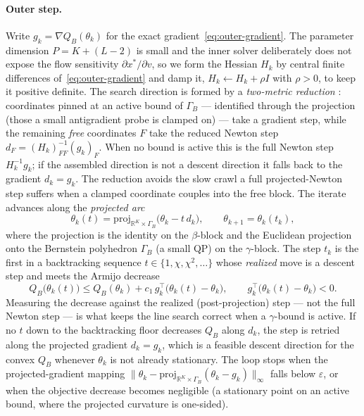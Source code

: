 \documentclass[12pt]{article}
\begin{document}
\paragraph{Outer step.} Write $g_k = \nabla Q_B(\theta_k)$ for the exact
gradient~\eqref{eq:outer-gradient}. The parameter dimension $P = K + (L-2)$ is
small and the inner solver deliberately does not expose the flow sensitivity
$\partial x^*/\partial v$, so we form the Hessian $H_k$ by central finite
differences of~\eqref{eq:outer-gradient} and damp it, $H_k \leftarrow H_k + \rho I$
with $\rho>0$, to keep it positive definite. The search direction is formed by a
\emph{two-metric reduction} \citep{nocedal2006numerical}: coordinates pinned at an
active bound of $\Gamma_B$ --- identified through the projection (those a small
antigradient probe is clamped on) --- take a gradient step, while the remaining
\emph{free} coordinates $F$ take the reduced Newton step $d_F = (H_k)_{FF}^{-1}(g_k)_F$.
When no bound is active this is the full Newton step $H_k^{-1} g_k$; if the assembled
direction is not a descent direction it falls back to the gradient $d_k = g_k$. The
reduction avoids the slow crawl a full projected-Newton step suffers when a clamped
coordinate couples into the free block. The iterate advances along the
\emph{projected arc}
\begin{equation}\label{eq:prox-step}
    \theta_k(t) = \mathrm{proj}_{\mathbb{R}^K \times \Gamma_B}\bigl(\theta_k - t\, d_k\bigr),
    \qquad \theta_{k+1} = \theta_k(t_k),
\end{equation}
where the projection is the identity on the $\beta$-block and the Euclidean
projection onto the Bernstein polyhedron $\Gamma_B$ (a small QP) on the
$\gamma$-block. The step $t_k$ is the first in a backtracking sequence
$t \in \{1, \chi, \chi^2, \dots\}$ whose \emph{realized} move is a descent step and
meets the Armijo decrease
\begin{equation}\label{eq:outer-armijo}
    Q_B\bigl(\theta_k(t)\bigr) \le Q_B(\theta_k) + c_1\, g_k^\top\bigl(\theta_k(t) - \theta_k\bigr),
    \qquad g_k^\top\bigl(\theta_k(t) - \theta_k\bigr) < 0 .
\end{equation}
Measuring the decrease against the realized (post-projection) step --- not the
full Newton step --- is what keeps the line search correct when a $\gamma$-bound
is active. If no $t$ down to the backtracking floor decreases $Q_B$ along $d_k$,
the step is retried along the projected gradient $d_k = g_k$, which is a feasible
descent direction for the convex $Q_B$ whenever $\theta_k$ is not already
stationary. The loop stops when the projected-gradient mapping
$\|\theta_k - \mathrm{proj}_{\mathbb{R}^K \times \Gamma_B}(\theta_k - g_k)\|_\infty$
falls below $\varepsilon$, or when the objective decrease becomes negligible (a
stationary point on an active bound, where the projected curvature is one-sided).
\end{document}
